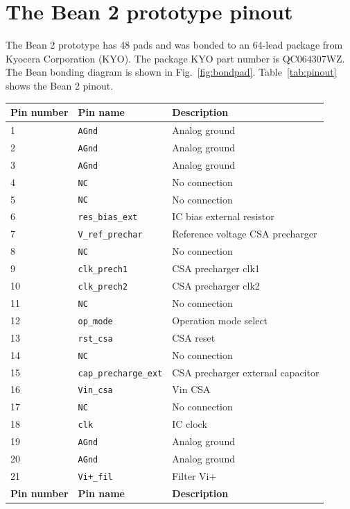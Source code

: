 \chapter{The Bean 2 prototype pinout} 
\label{appendix1}
The Bean 2 prototype has 48 pads and was bonded to an 64-lead package from \mbox{Kyocera} Corporation (KYO). The package KYO part number is QC064307WZ. The Bean bonding diagram is shown in Fig.~\ref{fig:bondpad}.
Table~\ref{tab:pinout} shows the Bean 2 pinout.

\begin{center}
\begin{longtable}{|l|l|l|}\hline
{\bf Pin number} & {\bf Pin name} & {\bf Description} \\ \hline\hline
1 & \verb=AGnd= & Analog ground \\\hline
2 & \verb=AGnd= & Analog ground \\\hline
3 & \verb=AGnd= & Analog ground \\\hline
4 & \verb=NC= & No connection \\\hline
5 & \verb=NC= & No connection \\\hline
6 & \verb=res_bias_ext= & IC bias external resistor \\\hline
7 & \verb=V_ref_prechar= & Reference voltage CSA precharger \\\hline
8 & \verb=NC= & No connection  \\\hline
9 &  \verb=clk_prech1= & CSA precharger clk1  \\\hline
10 & \verb=clk_prech2= & CSA precharger clk2  \\\hline
11 & \verb=NC= & No connection \\\hline
12 & \verb=op_mode= & Operation mode select \\\hline
13 & \verb=rst_csa= & CSA reset  \\\hline
14 & \verb=NC= & No connection \\\hline
15 & \verb=cap_precharge_ext= & CSA precharger external capacitor \\\hline
16 & \verb=Vin_csa= & Vin CSA \\\hline
17 & \verb=NC= & No connection \\\hline
18 & \verb=clk= & IC clock \\\hline
19 & \verb=AGnd= & Analog ground \\\hline
20 & \verb=AGnd= & Analog ground \\\hline
21 & \verb=Vi+_fil= & Filter Vi+ \\\hline
{\bf Pin number} & {\bf Pin name} & {\bf Description} \\ \hline\hline

\end{longtable}
\end{center}
